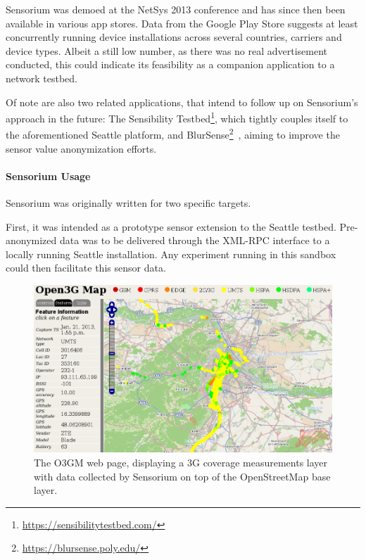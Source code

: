 Sensorium was demoed at the NetSys 2013 conference and has since then been available in various app stores. Data from the Google Play Store suggests at least  concurrently running device installations across several countries, carriers and device types. Albeit a still low number, as there was no real advertisement conducted, this could indicate its feasibility as a companion application to a network testbed.

Of note are also two related applications, that intend to follow up on Sensorium's approach in the future: The Sensibility Testbed\footnote{\url{https://sensibilitytestbed.com/}}, which tightly couples itself to the aforementioned Seattle platform, and BlurSense\footnote{\url{https://blursense.poly.edu/}}~\cite{6798970}, aiming to improve the sensor value anonymization efforts. 


\paragraph{Sensorium Usage}

Sensorium was originally written for two specific targets.

First, it was intended as a prototype sensor extension to the Seattle testbed. Pre-anonymized data was to be delivered through the \acrshort{XML}-\acrshort{RPC} interface to a locally running Seattle installation. Any experiment running in this sandbox could then facilitate this sensor data.

\begin{figure}[htb]
	\centering
	\includegraphics[width=\textwidth]{images/o3gm.png}
	\caption{The \gls{O3GM} web page, displaying a \gls{3G} coverage measurements layer with data collected by Sensorium on top of the OpenStreetMap base layer.}
\label{c5:fig:ogggm}
\end{figure}

